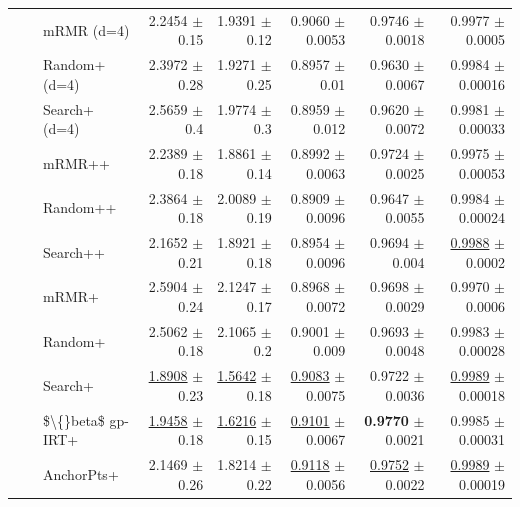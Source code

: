 \begin{longtable}{llp{}rrrrr}
 &  & mRMR (d=4) & 2.2454 {\scriptsize $\pm$ 0.15} & 1.9391 {\scriptsize $\pm$ 0.12} & 0.9060 {\scriptsize $\pm$ 0.0053} & 0.9746 {\scriptsize $\pm$ 0.0018} & 0.9977 {\scriptsize $\pm$ 0.0005} \\
 &  & Random+ (d=4) & 2.3972 {\scriptsize $\pm$ 0.28} & 1.9271 {\scriptsize $\pm$ 0.25} & 0.8957 {\scriptsize $\pm$ 0.01} & 0.9630 {\scriptsize $\pm$ 0.0067} & 0.9984 {\scriptsize $\pm$ 0.00016} \\
 &  & Search+ (d=4) & 2.5659 {\scriptsize $\pm$ 0.4} & 1.9774 {\scriptsize $\pm$ 0.3} & 0.8959 {\scriptsize $\pm$ 0.012} & 0.9620 {\scriptsize $\pm$ 0.0072} & 0.9981 {\scriptsize $\pm$ 0.00033} \\
 &  & mRMR++ & 2.2389 {\scriptsize $\pm$ 0.18} & 1.8861 {\scriptsize $\pm$ 0.14} & 0.8992 {\scriptsize $\pm$ 0.0063} & 0.9724 {\scriptsize $\pm$ 0.0025} & 0.9975 {\scriptsize $\pm$ 0.00053} \\
 &  & Random++ & 2.3864 {\scriptsize $\pm$ 0.18} & 2.0089 {\scriptsize $\pm$ 0.19} & 0.8909 {\scriptsize $\pm$ 0.0096} & 0.9647 {\scriptsize $\pm$ 0.0055} & 0.9984 {\scriptsize $\pm$ 0.00024} \\
 &  & Search++ & 2.1652 {\scriptsize $\pm$ 0.21} & 1.8921 {\scriptsize $\pm$ 0.18} & 0.8954 {\scriptsize $\pm$ 0.0096} & 0.9694 {\scriptsize $\pm$ 0.004} & \underline{0.9988} {\scriptsize $\pm$ 0.0002} \\
 &  & mRMR+ & 2.5904 {\scriptsize $\pm$ 0.24} & 2.1247 {\scriptsize $\pm$ 0.17} & 0.8968 {\scriptsize $\pm$ 0.0072} & 0.9698 {\scriptsize $\pm$ 0.0029} & 0.9970 {\scriptsize $\pm$ 0.0006} \\
 &  & Random+ & 2.5062 {\scriptsize $\pm$ 0.18} & 2.1065 {\scriptsize $\pm$ 0.2} & 0.9001 {\scriptsize $\pm$ 0.009} & 0.9693 {\scriptsize $\pm$ 0.0048} & 0.9983 {\scriptsize $\pm$ 0.00028} \\
 &  & Search+ & \underline{1.8908} {\scriptsize $\pm$ 0.23} & \underline{1.5642} {\scriptsize $\pm$ 0.18} & \underline{0.9083} {\scriptsize $\pm$ 0.0075} & 0.9722 {\scriptsize $\pm$ 0.0036} & \underline{0.9989} {\scriptsize $\pm$ 0.00018} \\
 &  & \$\textbackslash\{\}beta\$ gp-IRT+ & \underline{1.9458} {\scriptsize $\pm$ 0.18} & \underline{1.6216} {\scriptsize $\pm$ 0.15} & \underline{0.9101} {\scriptsize $\pm$ 0.0067} & \textbf{0.9770} {\scriptsize $\pm$ 0.0021} & 0.9985 {\scriptsize $\pm$ 0.00031} \\
 &  & AnchorPts+ & 2.1469 {\scriptsize $\pm$ 0.26} & 1.8214 {\scriptsize $\pm$ 0.22} & \underline{0.9118} {\scriptsize $\pm$ 0.0056} & \underline{0.9752} {\scriptsize $\pm$ 0.0022} & \underline{0.9989} {\scriptsize $\pm$ 0.00019} \\

\end{longtable}
